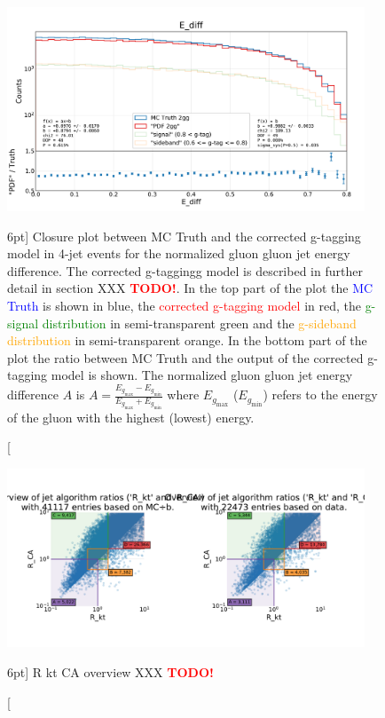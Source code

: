 \documentclass[a4paper, twoside, nobib]{tufte-book}
\newcommand{\code}[1]{\colorbox{light-gray}{\texttt{\detokenize{#1}}}}
\newcommand{\TODO}{\textcolor{red}{\bf TODO!}\xspace}
\begin{document}
\begin{figure}
  \includegraphics[width=0.95\textwidth, trim=0 0 0 65, clip, page=1]{figures/quarks/gtag-closure_test-down_sample=1.00-ML_vars=vertex-selection=b-ejet_min=4-n_iter_RS_lgb=99-n_iter_RS_xgb=9-cdot_cut=0.90-version=19-njet=3.pdf}
  \caption[Closure plot between MC Truth and the corrected g-tagging model in 4-jet events for the normalized gluon gluon jet energy difference][6pt]
          {Closure plot between MC Truth and the corrected g-tagging model in 4-jet events for the normalized gluon gluon jet energy difference. The corrected g-taggingg model is described in further detail in section XXX \TODO. In the top part of the plot the \textcolor{blue}{MC Truth} is shown in blue, the \textcolor{red}{corrected g-tagging model} \code{"PDF 2gg"} in red, the \textcolor{green}{g-signal distribution} in semi-transparent green and the \textcolor{orange}{g-sideband distribution} in semi-transparent orange. In the bottom part of the plot the ratio between MC Truth and the output of the corrected g-tagging model is shown. The normalized gluon gluon jet energy difference $A$ is $A=\frac{E_{g_\mathrm{max}}-E_{g_\mathrm{min}}}{E_{g_\mathrm{max}}+E_{g_\mathrm{min}}}$ where $E_{g_\mathrm{max}}$ ($E_{g_\mathrm{min}}$) refers to the energy of the gluon with the highest (lowest) energy.
          } 
  \label{fig:q:closure_E_diff}
\end{figure}


\begin{figure}
  \includegraphics[width=0.95\textwidth, trim=0 0 0 118, clip, page=1]{figures/quarks/gtag-R_kt_CA_overview-down_sample=1.00-ML_vars=vertex-selection=b-ejet_min=4-n_iter_RS_lgb=99-n_iter_RS_xgb=9-cdot_cut=0.90-version=19-njet=4}
  \caption[R kt CA overview  XXX \TODO][6pt]
          {R kt CA overview XXX \TODO
          } 
  \label{fig:q:R_kt_CA_overview}
\end{figure}
\end{document}
